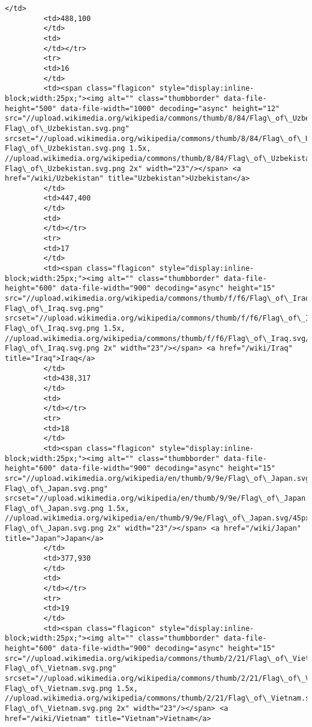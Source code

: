 \documentclass[11pt]{article}
\begin{document}
\begin{Verbatim}[commandchars=\\\{\}]
         </td>
         <td>488,100
         </td>
         <td>
         </td></tr>
         <tr>
         <td>16
         </td>
         <td><span class="flagicon" style="display:inline-block;width:25px;"><img alt="" class="thumbborder" data-file-height="500" data-file-width="1000" decoding="async" height="12" src="//upload.wikimedia.org/wikipedia/commons/thumb/8/84/Flag\_of\_Uzbekistan.svg/23px-Flag\_of\_Uzbekistan.svg.png" srcset="//upload.wikimedia.org/wikipedia/commons/thumb/8/84/Flag\_of\_Uzbekistan.svg/35px-Flag\_of\_Uzbekistan.svg.png 1.5x, //upload.wikimedia.org/wikipedia/commons/thumb/8/84/Flag\_of\_Uzbekistan.svg/46px-Flag\_of\_Uzbekistan.svg.png 2x" width="23"/></span> <a href="/wiki/Uzbekistan" title="Uzbekistan">Uzbekistan</a>
         </td>
         <td>447,400
         </td>
         <td>
         </td></tr>
         <tr>
         <td>17
         </td>
         <td><span class="flagicon" style="display:inline-block;width:25px;"><img alt="" class="thumbborder" data-file-height="600" data-file-width="900" decoding="async" height="15" src="//upload.wikimedia.org/wikipedia/commons/thumb/f/f6/Flag\_of\_Iraq.svg/23px-Flag\_of\_Iraq.svg.png" srcset="//upload.wikimedia.org/wikipedia/commons/thumb/f/f6/Flag\_of\_Iraq.svg/35px-Flag\_of\_Iraq.svg.png 1.5x, //upload.wikimedia.org/wikipedia/commons/thumb/f/f6/Flag\_of\_Iraq.svg/45px-Flag\_of\_Iraq.svg.png 2x" width="23"/></span> <a href="/wiki/Iraq" title="Iraq">Iraq</a>
         </td>
         <td>438,317
         </td>
         <td>
         </td></tr>
         <tr>
         <td>18
         </td>
         <td><span class="flagicon" style="display:inline-block;width:25px;"><img alt="" class="thumbborder" data-file-height="600" data-file-width="900" decoding="async" height="15" src="//upload.wikimedia.org/wikipedia/en/thumb/9/9e/Flag\_of\_Japan.svg/23px-Flag\_of\_Japan.svg.png" srcset="//upload.wikimedia.org/wikipedia/en/thumb/9/9e/Flag\_of\_Japan.svg/35px-Flag\_of\_Japan.svg.png 1.5x, //upload.wikimedia.org/wikipedia/en/thumb/9/9e/Flag\_of\_Japan.svg/45px-Flag\_of\_Japan.svg.png 2x" width="23"/></span> <a href="/wiki/Japan" title="Japan">Japan</a>
         </td>
         <td>377,930
         </td>
         <td>
         </td></tr>
         <tr>
         <td>19
         </td>
         <td><span class="flagicon" style="display:inline-block;width:25px;"><img alt="" class="thumbborder" data-file-height="600" data-file-width="900" decoding="async" height="15" src="//upload.wikimedia.org/wikipedia/commons/thumb/2/21/Flag\_of\_Vietnam.svg/23px-Flag\_of\_Vietnam.svg.png" srcset="//upload.wikimedia.org/wikipedia/commons/thumb/2/21/Flag\_of\_Vietnam.svg/35px-Flag\_of\_Vietnam.svg.png 1.5x, //upload.wikimedia.org/wikipedia/commons/thumb/2/21/Flag\_of\_Vietnam.svg/45px-Flag\_of\_Vietnam.svg.png 2x" width="23"/></span> <a href="/wiki/Vietnam" title="Vietnam">Vietnam</a>

\end{Verbatim}
\end{document}
